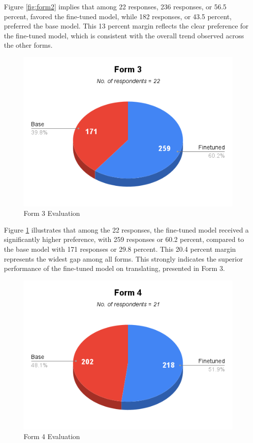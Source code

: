 Figure \ref{fig:form2} implies that among 22 responses, 236 responses, or 56.5 percent, favored the fine-tuned model, while 182 responses, or 43.5 percent, preferred the base model. This 13 percent margin reflects the clear preference for the fine-tuned model, which is consistent with the overall trend observed across the other forms. 

\begin{figure}[htbp]
	\centering
	\includegraphics[scale=0.7]{figures/Form3.png}
	\caption{Form 3 Evaluation}
	\label{fig:form3}
\end{figure}

Figure \ref{fig:form3} illustrates that among the 22 responses, the fine-tuned model received a significantly higher preference, with 259 responses or 60.2 percent, compared to the base model with 171 responses or 29.8 percent. This 20.4 percent margin represents the widest gap among all forms. This strongly indicates the superior performance of the fine-tuned model on translating, presented in Form 3. 

\begin{figure}[htbp]
	\centering
	\includegraphics[scale=0.7]{figures/Form4.png}
	\caption{Form 4 Evaluation}
	\label{fig:form4}
\end{figure}

